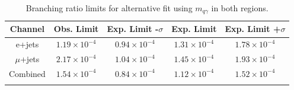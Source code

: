 \begin{table}[h!]
\begin{center}
{\renewcommand{\arraystretch}{1.2}
\begin{tabular}{ccccc}
\hhline{=====}
Channel  	&  Obs. Limit			&	Exp. Limit -$\sigma$	& Exp. Limit	& Exp. Limit +$\sigma$  \\  \hline 
e+jets	& $1.19\times10^{-4}$ 	& $0.94\times10^{-4}$	& $1.31\times10^{-4}$ & $1.78\times10^{-4}$	\\
$\mu$+jets	& $2.17\times10^{-4}$ 	& $1.04\times10^{-4}$	& $1.45\times10^{-4}$ & $1.93\times10^{-4}$	\\
Combined	& $1.54\times10^{-4}$ 	& $0.84\times10^{-4}$	& $1.12\times10^{-4}$ & $1.52\times10^{-4}$	\\
\hhline{=====}
\end{tabular}
\caption{Branching ratio limits for alternative fit using $m_{q\gamma}$ in both regions.}
}
\end{center}
\end{table}

